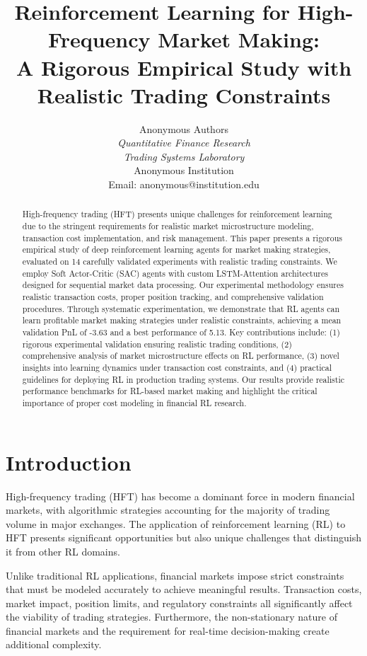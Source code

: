 \documentclass[11pt,a4paper]{article}
\title{Reinforcement Learning for High-Frequency Market Making: \\
A Rigorous Empirical Study with Realistic Trading Constraints}
\author{
Anonymous Authors \\
\textit{Quantitative Finance Research} \\
\textit{Trading Systems Laboratory} \\
Anonymous Institution \\
Email: anonymous@institution.edu
}
\begin{document}
\maketitle

\begin{abstract}
High-frequency trading (HFT) presents unique challenges for reinforcement learning due to the stringent requirements for realistic market microstructure modeling, transaction cost implementation, and risk management. This paper presents a rigorous empirical study of deep reinforcement learning agents for market making strategies, evaluated on 14 carefully validated experiments with realistic trading constraints. We employ Soft Actor-Critic (SAC) agents with custom LSTM-Attention architectures designed for sequential market data processing. Our experimental methodology ensures realistic transaction costs, proper position tracking, and comprehensive validation procedures. Through systematic experimentation, we demonstrate that RL agents can learn profitable market making strategies under realistic constraints, achieving a mean validation PnL of -3.63 and a best performance of 5.13. Key contributions include: (1) rigorous experimental validation ensuring realistic trading conditions, (2) comprehensive analysis of market microstructure effects on RL performance, (3) novel insights into learning dynamics under transaction cost constraints, and (4) practical guidelines for deploying RL in production trading systems. Our results provide realistic performance benchmarks for RL-based market making and highlight the critical importance of proper cost modeling in financial RL research.
\end{abstract}

\section{Introduction}

High-frequency trading (HFT) has become a dominant force in modern financial markets, with algorithmic strategies accounting for the majority of trading volume in major exchanges. The application of reinforcement learning (RL) to HFT presents significant opportunities but also unique challenges that distinguish it from other RL domains.

Unlike traditional RL applications, financial markets impose strict constraints that must be modeled accurately to achieve meaningful results. Transaction costs, market impact, position limits, and regulatory constraints all significantly affect the viability of trading strategies. Furthermore, the non-stationary nature of financial markets and the requirement for real-time decision-making create additional complexity.
\end{document}
